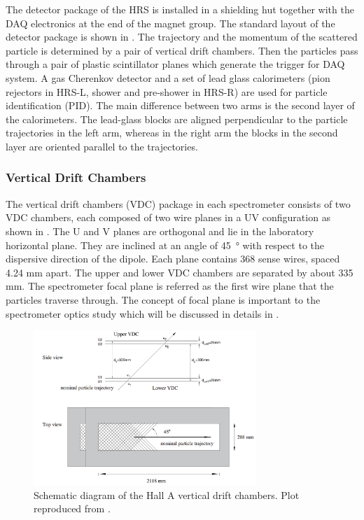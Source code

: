 The detector package of the HRS is installed in a shielding hut together with the DAQ electronics at the end of the magnet group. The standard layout of the detector package is shown in . The trajectory and the momentum of the scattered particle is determined by a pair of vertical drift chambers. Then the particles pass through a pair of plastic scintillator planes which generate the trigger for DAQ system. A gas Cherenkov detector and a set of lead glass calorimeters (pion rejectors in HRS-L, shower and pre-shower in HRS-R) are used for particle identification (PID). The main difference between two arms is the second layer of the calorimeters. The lead-glass blocks are aligned perpendicular to the particle trajectories in the left arm, whereas in the right arm the blocks in the second layer are oriented parallel to the trajectories.

\subsubsection{Vertical Drift Chambers}

The vertical drift chambers (VDC) package in each spectrometer consists of two VDC chambers, each composed of two wire planes in a UV configuration \cite{Fissum2001} as shown in . The U and V planes are orthogonal and lie in the laboratory horizontal plane. They are inclined at an angle of \SI{45}{\degree} with respect to the dispersive direction of the dipole. Each plane contains 368 sense wires, spaced 4.24 mm apart. The upper and lower VDC chambers are separated by about 335 mm. The spectrometer focal plane is referred as the first wire plane that the particles traverse through. The concept of focal plane is important to the spectrometer optics study which will be discussed in details in .

\begin{figure}[tb!]
  \centering
  \includegraphics[width=0.75\textwidth]{figs/VDC.png}
  \caption[Schematic diagram of the Hall A vertical drift chambers.]{Schematic diagram of the Hall A vertical drift chambers. Plot reproduced from \cite{Alcorn2004}. \label{C5S4SS2F2}}
\end{figure}

